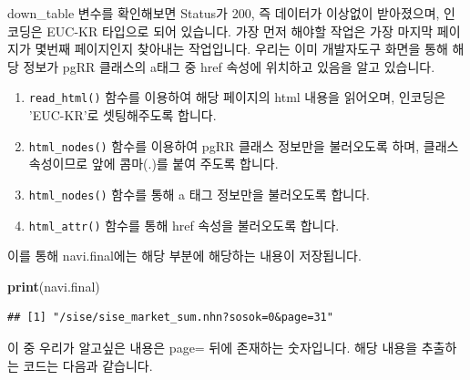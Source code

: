 \documentclass[]{book}
\newenvironment{Shaded}{\begin{snugshade}}{\end{snugshade}}
\newcommand{\DataTypeTok}[1]{\textcolor[rgb]{0.13,0.29,0.53}{#1}}
\newcommand{\KeywordTok}[1]{\textcolor[rgb]{0.13,0.29,0.53}{\textbf{#1}}}
\newcommand{\NormalTok}[1]{#1}
\newcommand{\OperatorTok}[1]{\textcolor[rgb]{0.81,0.36,0.00}{\textbf{#1}}}
\newcommand{\StringTok}[1]{\textcolor[rgb]{0.31,0.60,0.02}{#1}}
\providecommand{\tightlist}{%
  \setlength{\itemsep}{0pt}\setlength{\parskip}{0pt}}
\begin{document}
down\_table 변수를 확인해보면 Status가 200, 즉 데이터가 이상없이 받아졌으며, 인코딩은 EUC-KR 타입으로 되어 있습니다. 가장 먼저 해야할 작업은 가장 마지막 페이지가 몇번째 페이지인지 찾아내는 작업입니다. 우리는 이미 개발자도구 화면을 통해 해당 정보가 pgRR 클래스의 a태그 중 href 속성에 위치하고 있음을 알고 있습니다.

\begin{Shaded}
\end{Shaded}

\begin{enumerate}
\def\labelenumi{\arabic{enumi}.}
\tightlist
\item
  \texttt{read\_html()} 함수를 이용하여 해당 페이지의 html 내용을 읽어오며, 인코딩은 'EUC-KR'로 셋팅해주도록 합니다.
\item
  \texttt{html\_nodes()} 함수를 이용하여 pgRR 클래스 정보만을 불러오도록 하며, 클래스 속성이므로 앞에 콤마(.)를 붙여 주도록 합니다.
\item
  \texttt{html\_nodes()} 함수를 통해 a 태그 정보만을 불러오도록 합니다.
\item
  \texttt{html\_attr()} 함수를 통해 href 속성을 불러오도록 합니다.
\end{enumerate}

이를 통해 navi.final에는 해당 부분에 해당하는 내용이 저장됩니다.

\begin{Shaded}
\begin{Highlighting}[]
\KeywordTok{print}\NormalTok{(navi.final)}
\end{Highlighting}
\end{Shaded}

\begin{verbatim}
## [1] "/sise/sise_market_sum.nhn?sosok=0&page=31"
\end{verbatim}

이 중 우리가 알고싶은 내용은 page= 뒤에 존재하는 숫자입니다. 해당 내용을 추출하는 코드는 다음과 같습니다.
\end{document}
